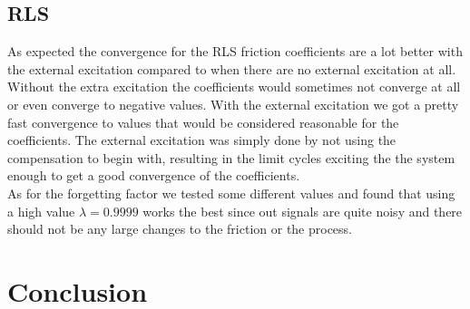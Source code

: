\documentclass[10pt,a4paper]{article}
\begin{document}
\subsection{RLS}
As expected the convergence for the RLS friction coefficients are a lot better with the external excitation compared to when there are no external excitation at all. Without the extra excitation the coefficients would sometimes not converge at all or even converge to negative values. With the external excitation we got a pretty fast convergence to values that would be considered reasonable for the coefficients. The external excitation was simply done by not using the compensation to begin with, resulting in the limit cycles exciting the the system enough to get a good convergence of the coefficients.\\

As for the forgetting factor we tested some different values and found that using a high value $\lambda = 0.9999$ works the best since out signals are quite noisy and there should not be any large changes to the friction or the process. 



\section{Conclusion}
\end{document}
